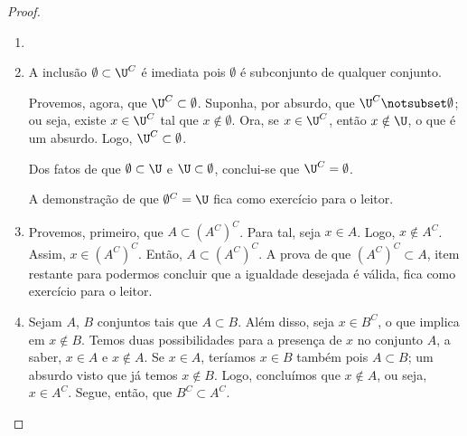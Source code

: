 \begin{proof}
\begin{enumerate}
\item[]
\item A inclusão $\emptyset \subset \U^C$ é imediata pois $\emptyset$ é subconjunto de qualquer conjunto. 

Provemos, agora, que $\U^C \subset \emptyset$. Suponha, por absurdo, que $\U^C \notsubset \emptyset$; ou seja, existe $x \in \U^C$ tal que $x \notin \emptyset$. Ora, se $x \in \U^C$, então $x \notin \U$, o que é um absurdo. Logo, $\U^C \subset \emptyset$.

Dos fatos de que $\emptyset \subset \U$ e $\U \subset \emptyset$, conclui-se que $\U^C = \emptyset$.

A demonstração de que $\emptyset^C = \U$ fica como exercício para o leitor.

\item Provemos, primeiro, que $A \subset (A^C)^C$. Para tal, seja $x \in A$. Logo, $x \notin A^C$. Assim, $x \in (A^C)^C$. Então, $A \subset (A^C)^C$. A prova de que $(A^C)^C \subset A$, item restante para podermos concluir que a igualdade desejada é válida, fica como exercício para o leitor.

\item Sejam $A$, $B$ conjuntos tais que $A \subset B$. Além disso, seja $x \in B^C$, o que implica em $x \notin B$. Temos duas possibilidades para a presença de $x$ no conjunto $A$, a saber, $x \in A$ e $x \notin A$. Se $x \in A$, teríamos $x \in B$ também pois $A \subset B$; um absurdo visto que já temos $x \notin B$. Logo, concluímos que $x \notin A$, ou seja, $x \in A^C$. Segue, então, que $B^C \subset A^C$.
\end{enumerate}
\end{proof}


